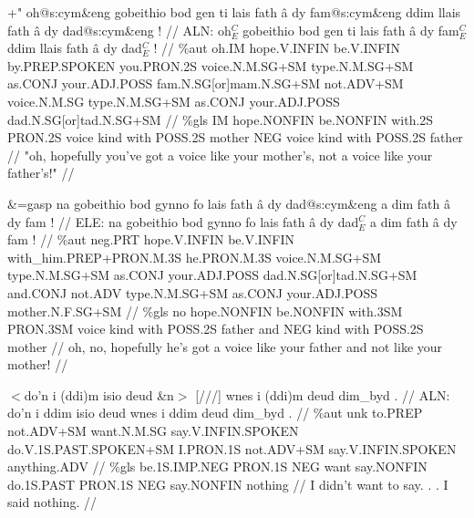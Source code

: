 \documentclass[a4paper,10pt]{article}
\begin{document}
\ex
\begingl[lingstyle=gergl]
\glchat +" oh@s:cym\&eng gobeithio bod gen ti lais fath â dy fam@s:cym\&eng ddim llais fath â dy dad@s:cym\&eng ! //
\glsurface ALN:  oh$^{C}_{E}$ gobeithio bod gen ti lais fath â dy fam$^{C}_{E}$ ddim llais fath â dy dad$^{C}_{E}$ !  //
\glauto \%aut  oh{\scriptsize .IM} hope{\scriptsize .V.INFIN} be{\scriptsize .V.INFIN} by{\scriptsize .PREP.SPOKEN} you{\scriptsize .PRON.2S} voice{\scriptsize .N.M.SG+SM} type{\scriptsize .N.M.SG+SM} as{\scriptsize .CONJ} your{\scriptsize .ADJ.POSS} fam{\scriptsize .N.SG[or]mam.N.SG+SM} not{\scriptsize .ADV+SM} voice{\scriptsize .N.M.SG} type{\scriptsize .N.M.SG+SM} as{\scriptsize .CONJ} your{\scriptsize .ADJ.POSS} dad{\scriptsize .N.SG[or]tad.N.SG+SM}   //
\glmanual \%gls  IM hope{\scriptsize .NONFIN} be{\scriptsize .NONFIN} with{\scriptsize .2S} PRON{\scriptsize .2S} voice kind with POSS{\scriptsize .2S} mother NEG voice kind with POSS{\scriptsize .2S} father   //
\gleng "oh, hopefully you've got a voice like your mother's, not a voice like your father's!" //
\endgl
\xe

\ex
\begingl[lingstyle=gergl]
\glchat \&=gasp na gobeithio bod gynno fo lais fath â dy dad@s:cym\&eng a dim fath â dy fam ! //
\glsurface ELE:  na gobeithio bod gynno fo lais fath â dy dad$^{C}_{E}$ a dim fath â dy fam !  //
\glauto \%aut  neg{\scriptsize .PRT} hope{\scriptsize .V.INFIN} be{\scriptsize .V.INFIN} with\_him{\scriptsize .PREP+PRON.M.3S} he{\scriptsize .PRON.M.3S} voice{\scriptsize .N.M.SG+SM} type{\scriptsize .N.M.SG+SM} as{\scriptsize .CONJ} your{\scriptsize .ADJ.POSS} dad{\scriptsize .N.SG[or]tad.N.SG+SM} and{\scriptsize .CONJ} not{\scriptsize .ADV} type{\scriptsize .N.M.SG+SM} as{\scriptsize .CONJ} your{\scriptsize .ADJ.POSS} mother{\scriptsize .N.F.SG+SM}   //
\glmanual \%gls  no hope{\scriptsize .NONFIN} be{\scriptsize .NONFIN} with{\scriptsize .3SM} PRON{\scriptsize .3SM} voice kind with POSS{\scriptsize .2S} father and NEG kind with POSS{\scriptsize .2S} mother   //
\gleng oh, no, hopefully he's got a voice like your father and not like your mother! //
\endgl
\xe

\ex
\begingl[lingstyle=gergl]
\glchat $<$do'n i (ddi)m isio deud \&n$>$ [///] wnes i (ddi)m deud dim\_byd . //
\glsurface ALN:  do'n i ddim isio deud wnes i ddim deud dim\_byd .  //
\glauto \%aut  unk to{\scriptsize .PREP} not{\scriptsize .ADV+SM} want{\scriptsize .N.M.SG} say{\scriptsize .V.INFIN.SPOKEN} do{\scriptsize .V.1S.PAST.SPOKEN+SM} I{\scriptsize .PRON.1S} not{\scriptsize .ADV+SM} say{\scriptsize .V.INFIN.SPOKEN} anything{\scriptsize .ADV}   //
\glmanual \%gls  be{\scriptsize .1S.IMP.NEG} PRON{\scriptsize .1S} NEG want say{\scriptsize .NONFIN} do{\scriptsize .1S.PAST} PRON{\scriptsize .1S} NEG say{\scriptsize .NONFIN} nothing   //
\gleng I didn't want to say. . . I said nothing. //
\endgl
\xe
\end{document}

